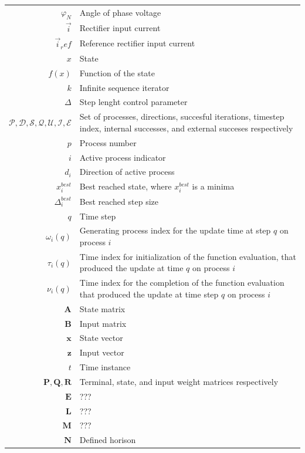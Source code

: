 \begin{longtable}{r l}
	$\varphi_N$												& Angle of phase voltage\\
	$\vec{i}$													& Rectifier input current\\
	$\vec{i}_ref$											& Reference rectifier input current\\
	$x$																& State\\
	$f(x)$														& Function of the state\\
	$k$																& Infinite sequence iterator\\
	$\Delta$													& Step lenght control parameter\\
	$\mathcal{P},\mathcal{D},\mathcal{S},\mathcal{Q},\mathcal{U},\mathcal{I},\mathcal{E}$ & Set of processes, directions, succesful iterations, timestep index, internal successes, and external succeses respectively\\
	$p$																& Process number\\
	$i$																& Active process indicator\\
	$d_i$															& Direction of active process\\
	$x_i^{best}$											& Best reached state, where $x_i^{best}$ is a minima\\
	$\Delta_i^{best}$											& Best reached step size\\
	$q$																& Time step\\
	$\omega_i(q)$ 										& Generating process index for the update time at step $q$ on process $i$\\
	$\tau_i(q)$												& Time index for initialization of the function evaluation, that produced the update at time $q$ on process $i$\\
	$\nu_i(q)$ 												& Time index for the completion of the function evaluation that produced the update at time step $q$ on process $i$\\
	$\textbf{A}$																& State matrix\\
	$\textbf{B}$																& Input matrix\\
	$\textbf{x}$											& State vector\\
	$\textbf{z}$											& Input vector\\
	$t$																& Time instance\\
	$\textbf{P}, \textbf{Q},\textbf{R}$ & Terminal, state, and input weight matrices respectively\\
	$\textbf{E}$																&???\\
	$\textbf{L}$																&???\\
	$\textbf{M}$																&???\\
	$\textbf{N}$											& Defined horison\\
	
\hline
\end{longtable}

%

